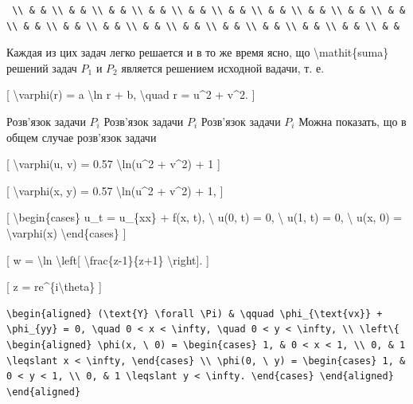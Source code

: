 \documentclass[
]{article}
\begin{document}
\begin{verbatim}
 \\ & & \\ & & \\ & & \\ & & \\ & & \\ & & \\ & & \\ & & \\ & & \\ & & \\ & & \\ & & \\ & & \\ & & \\ & & \\ & & \\ & & \\ & & \\ & & \\ & &
\end{verbatim}

Каждая из цих задач легко решается и в то же время ясно, що
\textbackslash mathit\{suma\} решений задач \(P_1\) и \(P_2\) является
решением исходной вадачи, т. е.

{[} \textbackslash varphi(r) = a \textbackslash ln r + b,
\textbackslash quad r = u\^{}2 + v\^{}2. {]}

Розв'язок задачи \(P_{i}\) Розв'язок задачи \(P_i\) Розв'язок задачи
\(P_i\) Можна показать, що в общем случае розв'язок задачи

{[} \textbackslash varphi(u, v) = 0.57 \textbackslash ln(u\^{}2 +
v\^{}2) + 1 {]}

{[} \textbackslash varphi(x, y) = 0.57 \textbackslash ln(u\^{}2 +
v\^{}2) + 1, {]}

{[} \textbackslash begin\{cases\} u\_t = u\_\{xx\} + f(x, t),
\textbackslash{} u(0, t) = 0, \textbackslash{} u(1, t) = 0,
\textbackslash{} u(x, 0) = \textbackslash varphi(x)
\textbackslash end\{cases\} {]}

{[} w = \textbackslash ln \textbackslash left{[}
\textbackslash frac\{z-1\}\{z+1\} \textbackslash right{]}. {]}

{[} z = re\^{}\{i\textbackslash theta\} {]}

\begin{verbatim}
\begin{aligned} (\text{Y} \forall \Pi) & \qquad \phi_{\text{vx}} + \phi_{yy} = 0, \quad 0 < x < \infty, \quad 0 < y < \infty, \\ \left\{ \begin{aligned} \phi(x, \ 0) = \begin{cases} 1, & 0 < x < 1, \\ 0, & 1 \leqslant x < \infty, \end{cases} \\ \phi(0, \ y) = \begin{cases} 1, & 0 < y < 1, \\ 0, & 1 \leqslant y < \infty. \end{cases} \end{aligned} \end{aligned}
\end{verbatim}
\end{document}
